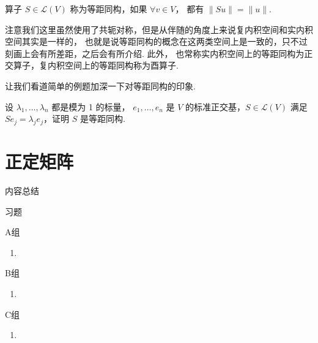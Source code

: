 \begin{definition}
     算子 $ S \in \mathcal{L}(V) $ 称为等距同构，如果 $ \forall v \in V $，
    都有 $ \lVert Su \rVert = \lVert u \rVert $.  
\end{definition}

注意我们这里虽然使用了共轭对称，但是从伴随的角度上来说复内积空间和实内积空间其实是一样的，
也就是说等距同构的概念在这两类空间上是一致的，只不过刻画上会有所差距，之后会有所介绍. 此外，
也常称实内积空间上的等距同构为正交算子，复内积空间上的等距同构称为酉算子. 

让我们看道简单的例题加深一下对等距同构的印象. 
\begin{example}
    设 $ \lambda_1, \ldots , \lambda_n $ 都是模为 1 的标量，
    $ e_1, \ldots , e_n $ 是 $ V $ 的标准正交基，$ S \in \mathcal{L}(V) $ 
    满足 $ Se_j = \lambda_je_j $，证明 $ S $ 是等距同构. 
\end{example}

\section{正定矩阵}

\vspace{2ex}
\centerline{\heiti \Large 内容总结}

\vspace{2ex}

\centerline{\heiti \Large 习题}
\vspace{2ex}
{\kaishu }
\begin{flushright}
    \kaishu

\end{flushright}
\centerline{\heiti A组}
\begin{enumerate}
    \item
\end{enumerate}
\centerline{\heiti B组}
\begin{enumerate}
    \item
\end{enumerate}
\centerline{\heiti C组}
\begin{enumerate}
    \item
\end{enumerate}
